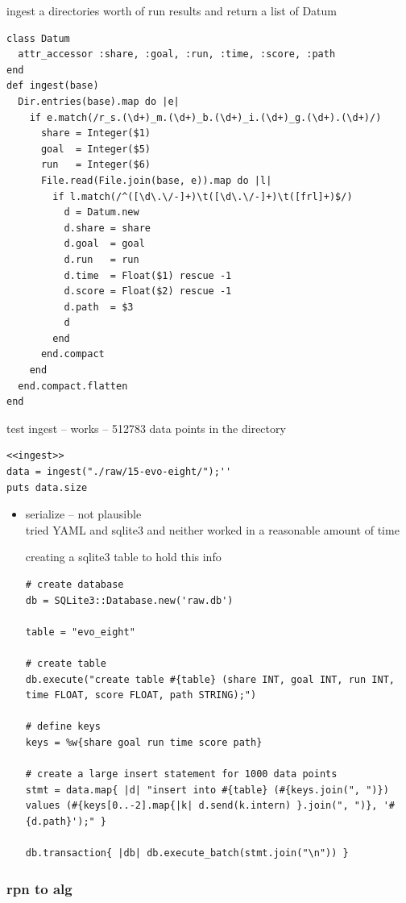 \documentclass[11pt]{article}
\begin{document}
ingest a directories worth of run results and return a list of Datum
\lstset{language=Ruby}
\begin{lstlisting}
class Datum
  attr_accessor :share, :goal, :run, :time, :score, :path
end
def ingest(base)
  Dir.entries(base).map do |e|
    if e.match(/r_s.(\d+)_m.(\d+)_b.(\d+)_i.(\d+)_g.(\d+).(\d+)/)
      share = Integer($1)
      goal  = Integer($5)
      run   = Integer($6)
      File.read(File.join(base, e)).map do |l|
        if l.match(/^([\d\.\/-]+)\t([\d\.\/-]+)\t([frl]+)$/)
          d = Datum.new
          d.share = share
          d.goal  = goal
          d.run   = run
          d.time  = Float($1) rescue -1
          d.score = Float($2) rescue -1
          d.path  = $3
          d
        end
      end.compact
    end
  end.compact.flatten
end
\end{lstlisting}

test ingest -- works -- 512783 data points in the directory
\lstset{language=Ruby}
\begin{lstlisting}
<<ingest>>
data = ingest("./raw/15-evo-eight/");''
puts data.size
\end{lstlisting}
\begin{itemize}

\item serialize -- not plausible\\
\label{sec-2.5.1.1}%
tried YAML and sqlite3 and neither worked in a reasonable amount of
time

creating a sqlite3 table to hold this info
\lstset{language=Ruby}
\begin{lstlisting}
# create database
db = SQLite3::Database.new('raw.db')

table = "evo_eight"

# create table
db.execute("create table #{table} (share INT, goal INT, run INT, time FLOAT, score FLOAT, path STRING);")

# define keys
keys = %w{share goal run time score path}

# create a large insert statement for 1000 data points
stmt = data.map{ |d| "insert into #{table} (#{keys.join(", ")}) values (#{keys[0..-2].map{|k| d.send(k.intern) }.join(", ")}, '#{d.path}');" }

db.transaction{ |db| db.execute_batch(stmt.join("\n")) }
\end{lstlisting}

\end{itemize} %
\subsubsection*{rpn to alg}
\label{sec-2.5.2}
\end{document}
